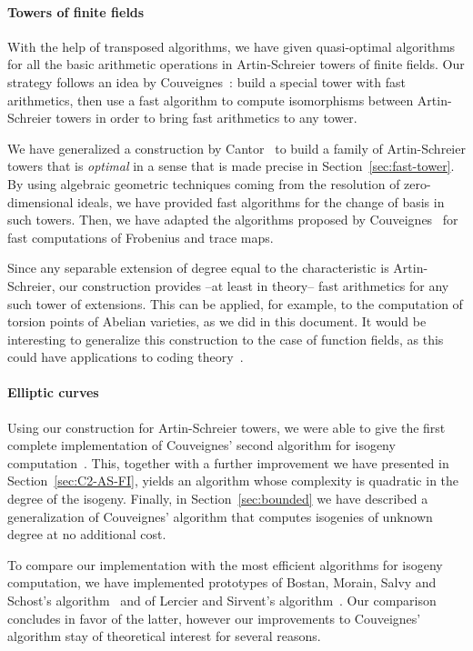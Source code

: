\paragraph{Towers of finite fields}
With the help of transposed algorithms, we have given quasi-optimal
algorithms for all the basic arithmetic operations in Artin-Schreier
towers of finite fields. Our strategy follows an idea by
Couveignes~\cite{couveignes00}: build a special tower with fast
arithmetics, then use a fast algorithm to compute isomorphisms between
Artin-Schreier towers in order to bring fast arithmetics to any tower.

We have generalized a construction by Cantor~\cite{cantor89} to build
a family of Artin-Schreier towers that is \emph{optimal} in a sense
that is made precise in Section~\ref{sec:fast-tower}. By using
algebraic geometric techniques coming from the resolution of
zero-dimensional ideals, we have provided fast algorithms for the
change of basis in such towers. Then, we have adapted the algorithms
proposed by Couveignes~\cite{couveignes00} for fast computations of
Frobenius and trace maps.

Since any separable extension of degree equal to the characteristic is
Artin-Schreier, our construction provides --at least in theory-- fast
arithmetics for any such tower of extensions.  This can be applied,
for example, to the computation of torsion points of Abelian
varieties, as we did in this document. It would be interesting to
generalize this construction to the case of function fields, as this
could have applications to coding
theory~\cite{garcia+stichtenoth96,shum-et-al01}.

\paragraph{Elliptic curves}
Using our construction for Artin-Schreier towers, we were able to give
the first complete implementation of Couveignes' second algorithm for
isogeny computation~\cite{couveignes96}. This, together with a further
improvement we have presented in Section~\ref{sec:C2-AS-FI}, yields an
algorithm whose complexity is quadratic in the degree of the
isogeny. Finally, in Section~\ref{sec:bounded} we have described a
generalization of Couveignes' algorithm that computes isogenies of
unknown degree at no additional cost.

To compare our implementation with the most efficient algorithms for
isogeny computation, we have implemented prototypes of Bostan, Morain,
Salvy and Schost's algorithm~\cite{bostan+morain+salvy+schost08} and
of Lercier and Sirvent's algorithm~\cite{lercier+sirvent08}. Our
comparison concludes in favor of the latter, however our improvements
to Couveignes' algorithm stay of theoretical interest for several
reasons.


